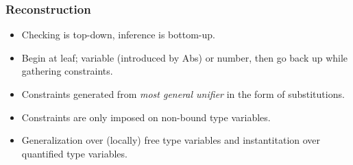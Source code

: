 \documentclass{beamer}
\begin{document}
\begin{frame}
\frametitle{Reconstruction}
    \begin{itemize}
        \item Checking is top-down, inference is bottom-up.
        \item Begin at leaf; variable (introduced by Abs) or number, then go back up while gathering constraints.
        \item Constraints generated from \textit{most general unifier} in the form of substitutions.
        \item Constraints are only imposed on non-bound type variables.
        \item Generalization over (locally) free type variables and instantitation over quantified type variables.
    \end{itemize}
\end{frame}
\end{document}
